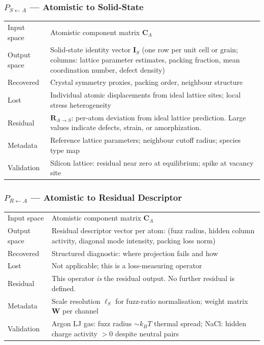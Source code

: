 \documentclass[11pt, a4paper, oneside]{article}
\newcommand{\Comp}[1]{\mathbf{C}_{#1}}
\newcommand{\Ident}[1]{\mathbf{I}_{#1}}
\newcommand{\Resid}[1]{\mathbf{R}_{#1}}
\newcommand{\ScaleL}{\ell_S}
\begin{document}
\begin{appendices}
\vspace{1em}

\subsubsection*{$P_{S \leftarrow A}$ --- Atomistic to Solid-State}

\begin{tabularx}{\linewidth}{l X}
  \toprule
  Input space & Atomistic component matrix $\Comp{A}$ \\
  Output space & Solid-state identity vector $\Ident{S}$
	(one row per unit cell or grain;
	columns: lattice parameter estimates, packing fraction,
	mean coordination number, defect density) \\
  Recovered & Crystal symmetry proxies, packing order, neighbour structure \\
  Lost & Individual atomic displacements from ideal lattice sites;
	local stress heterogeneity \\
  Residual & $\Resid{A \to S}$: per-atom deviation from
	ideal lattice prediction. Large values indicate
	defects, strain, or amorphization. \\
  Metadata & Reference lattice parameters; neighbour cutoff radius;
	species type map \\
  Validation & Silicon lattice: residual near zero at equilibrium;
	spike at vacancy site \\
  \bottomrule
\end{tabularx}

\vspace{1em}

\subsubsection*{$P_{R \leftarrow A}$ --- Atomistic to Residual Descriptor}

\begin{tabularx}{\linewidth}{l X}
  \toprule
  Input space & Atomistic component matrix $\Comp{A}$ \\
  Output space & Residual descriptor vector per atom:
	(fuzz radius, hidden column activity,
	diagonal mode intensity, packing loss norm) \\
  Recovered & Structured diagnostic: where projection fails and how \\
  Lost & Not applicable; this is a loss-measuring operator \\
  Residual & This operator \emph{is} the residual output. No further
	residual is defined. \\
  Metadata & Scale resolution $\ScaleL$ for fuzz-ratio normalisation;
	weight matrix $\mathbf{W}$ per channel \\
  Validation & Argon LJ gas: fuzz radius $\sim k_BT$ thermal spread;
	NaCl: hidden charge activity $> 0$ despite neutral pairs \\
  \bottomrule
\end{tabularx}


\end{appendices}
\end{document}
